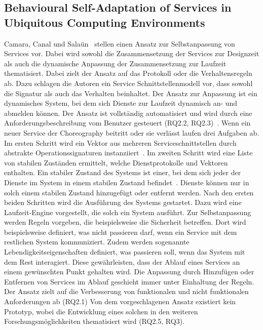 \documentclass[conference,compsoc]{IEEEtran}
\begin{document}
\subsection{Behavioural Self-Adaptation of Services in Ubiquitous Computing Environments}
Camara, Canal und Salaün~\cite{camara2009behavioural} stellen einen Ansatz zur Selbstanpassung von Services vor. Dabei wird sowohl die Zusammensetzung der Services zur Designzeit als auch die dynamische Anpassung der Zusammensetzung zur Laufzeit thematisiert.
Dabei zielt der Ansatz auf das Protokoll oder die Verhaltensregeln ab. Dazu schlagen die Autoren ein Service Schnittstellenmodell vor, dass sowohl die Signatur als auch das Verhalten beinhaltet.
Der Ansatz zur Anpassung ist ein dynamisches System, bei dem sich Dienste zur Laufzeit dynamisch an- und abmelden können. Der Ansatz ist vollständig automatisiert und wird durch eine Anforderungsbeschreibung vom Benutzer gesteuert (RQ2.2, RQ2.3)~\cite{camara2009behavioural}. Wenn ein neuer Service der Choreography beitritt oder sie verlässt laufen drei Aufgaben ab. Im ersten Schritt wird ein Vektor aus mehreren Serviceschnittstellen durch abstrakte Operationssignaturen instanziiert~\cite{camara2009behavioural}. Im zweiten Schritt wird eine Liste von stabilen Zuständen ermittelt, welche Dienstprotokolle und Vektoren enthalten. Ein stabiler Zustand des Systems ist einer, bei dem sich jeder der Dienste im System in einem stabilen Zustand befindet~\cite{camara2009behavioural}. Dienste können nur in solch einem stabilen Zustand hinzugefügt oder entfernt werden. Nach den ersten beiden Schritten wird die Ausführung des Systems gestartet. Dazu wird eine Laufzeit-Engine vorgestellt, die solch ein System ausführt.
Zur Selbstanpassung werden Regeln vorgeben, die beispielsweise die Sicherheit betreffen. Dort wird beispielsweise definiert, was nicht passieren darf, wenn ein Service mit dem restlichen System kommuniziert.
Zudem werden sogenannte Lebendigkeitseigenschaften definiert, was passieren soll, wenn das System mit dem Rest interagiert. Diese gewährleisten, dass der Ablauf eines Services an einem gewünschten Punkt gehalten wird. Die Anpassung durch Hinzufügen oder Entfernen von Services im Ablauf geschieht immer unter Einhaltung der Regeln.
Der Ansatz zielt auf die Verbesserung von funktionalen und nicht funktionalen Anforderungen ab (RQ2.1)
Von dem vorgeschlagenen Ansatz existiert kein Prototyp, wobei die Entwicklung eines solchen in den weiteren Forschungsmöglichkeiten thematisiert wird (RQ2.5, RQ3).
\end{document}
